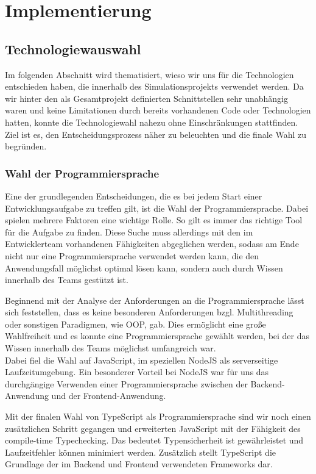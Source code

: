 \chapter{Implementierung}

\section{Technologiewauswahl}

Im folgenden Abschnitt wird thematisiert, wieso wir uns für die Technologien entschieden haben, die innerhalb des Simulationsprojekts verwendet werden.
Da wir hinter den als Gesamtprojekt definierten Schnittstellen sehr unabhängig waren und keine Limitationen durch bereits vorhandenen Code oder Technologien hatten, konnte die Technologiewahl nahezu ohne Einschränkungen stattfinden.
Ziel ist es, den Entscheidungsprozess näher zu beleuchten und die finale Wahl zu begründen.

\subsection*{Wahl der Programmiersprache}
Eine der grundlegenden Entscheidungen, die es bei jedem Start einer Entwicklungsaufgabe zu treffen gilt, ist die Wahl der Programmiersprache. Dabei spielen mehrere Faktoren eine wichtige Rolle. So gilt es immer das richtige Tool für die Aufgabe zu finden. Diese Suche muss allerdings mit den im Entwicklerteam vorhandenen Fähigkeiten abgeglichen werden, sodass am Ende nicht nur eine Programmiersprache verwendet werden kann, die den Anwendungsfall möglichst optimal lösen kann, sondern auch durch Wissen innerhalb des Teams gestützt ist.

Beginnend mit der Analyse der Anforderungen an die Programmiersprache lässt sich feststellen, dass es keine besonderen Anforderungen bzgl. Multithreading oder sonstigen Paradigmen, wie OOP, gab. Dies ermöglicht eine große Wahlfreiheit und es konnte eine Programmiersprache gewählt werden, bei der das Wissen innerhalb des Teams möglichst umfangreich war.\\
Dabei fiel die Wahl auf JavaScript, im speziellen NodeJS als serverseitige Laufzeitumgebung. Ein besonderer Vorteil bei NodeJS war für uns das durchgängige Verwenden einer Programmiersprache zwischen der Backend-Anwendung und der Frontend-Anwendung.

Mit der finalen Wahl von TypeScript als Programmiersprache sind wir noch einen zusätzlichen Schritt gegangen und erweiterten JavaScript mit der Fähigkeit des compile-time Typechecking. Das bedeutet Typensicherheit ist gewährleistet und Laufzeitfehler können minimiert werden. Zusätzlich stellt TypeScript die Grundlage der im Backend und Frontend verwendeten Frameworks dar.

